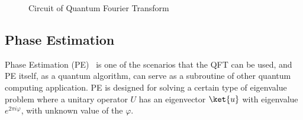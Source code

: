 \begin{figure}
    \centering
    \caption{Circuit of Quantum Fourier Transform}
    \label{fig:QFT}
\end{figure}

\subsection{Phase Estimation}
Phase Estimation (PE)~\cite{Abhijith2018QuantumBeginner,NielsenChuang2010} is one of the scenarios that the QFT can be used, and PE itself, as a quantum algorithm, can serve as a subroutine of other quantum computing application. PE is designed for solving a certain type of eigenvalue problem where a unitary operator $U$ has an eigenvector $\ket{u}$ with eigenvalue $e^{2\pi i\varphi}$, with unknown value of the $\varphi$.

